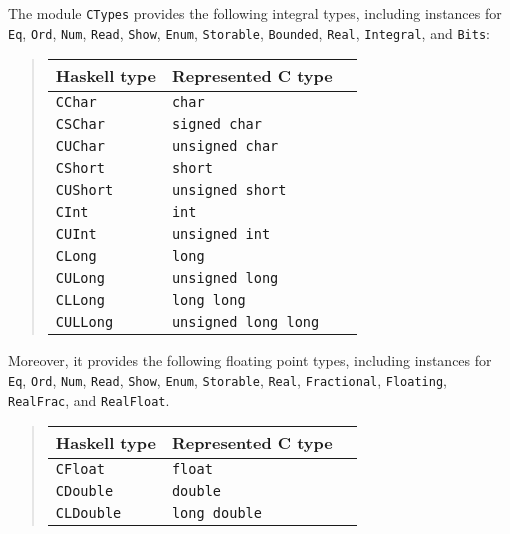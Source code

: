 \documentclass[a4paper,twosides]{article}
\newcommand{\code}[1]{\texttt{#1}}      %
\begin{document}
The module \code{CTypes} provides the following integral types, including
instances for \code{Eq}, \code{Ord}, \code{Num}, \code{Read}, \code{Show},
\code{Enum}, \code{Storable}, \code{Bounded}, \code{Real}, \code{Integral},
and \code{Bits}:
%
\begin{quote}
  \begin{tabular}{|l|l|l|}
    \hline
    Haskell type     & Represented C type\\\hline\hline
    \code{CChar}     & \code{char}\\\hline
    \code{CSChar}    & \code{signed char}\\\hline
    \code{CUChar}    & \code{unsigned char}\\\hline
    \code{CShort}    & \code{short}\\\hline
    \code{CUShort}   & \code{unsigned short}\\\hline
    \code{CInt}      & \code{int}\\\hline
    \code{CUInt}     & \code{unsigned int}\\\hline
    \code{CLong}     & \code{long}\\\hline
    \code{CULong}    & \code{unsigned long}\\\hline
    \code{CLLong}    & \code{long long}\\\hline
    \code{CULLong}   & \code{unsigned long long}\\\hline
  \end{tabular}
\end{quote}
%
Moreover, it provides the following floating point types, including instances
for \code{Eq}, \code{Ord}, \code{Num}, \code{Read}, \code{Show}, \code{Enum},
\code{Storable}, \code{Real}, \code{Fractional}, \code{Floating},
\code{RealFrac}, and \code{RealFloat}.
%
\begin{quote}
  \begin{tabular}{|l|l|l|}
    \hline
    Haskell type     & Represented C type\\\hline\hline
    \code{CFloat}    & \code{float}\\\hline
    \code{CDouble}   & \code{double}\\\hline
    \code{CLDouble}  & \code{long double}\\\hline
  \end{tabular}
\end{quote}
\end{document}
